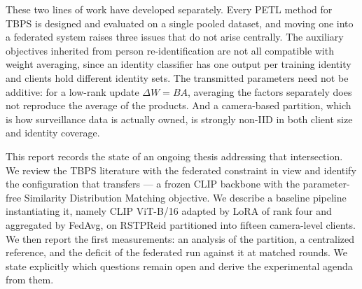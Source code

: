 These two lines of work have developed separately. Every PETL method for TBPS is designed and evaluated on a single pooled dataset, and moving one into a federated system raises three issues that do not arise centrally. The auxiliary objectives inherited from person re-identification are not all compatible with weight averaging, since an identity classifier has one output per training identity and clients hold different identity sets. The transmitted parameters need not be additive: for a low-rank update $\Delta W=BA$, averaging the factors separately does not reproduce the average of the products. And a camera-based partition, which is how surveillance data is actually owned, is strongly non-IID in both client size and identity coverage.

This report records the state of an ongoing thesis addressing that intersection. We review the TBPS literature with the federated constraint in view and identify the configuration that transfers --- a frozen CLIP backbone with the parameter-free Similarity Distribution Matching objective. We describe a baseline pipeline instantiating it, namely CLIP ViT-B/16 adapted by LoRA of rank four and aggregated by FedAvg, on RSTPReid partitioned into fifteen camera-level clients. We then report the first measurements: an analysis of the partition, a centralized reference, and the deficit of the federated run against it at matched rounds. We state explicitly which questions remain open and derive the experimental agenda from them.
